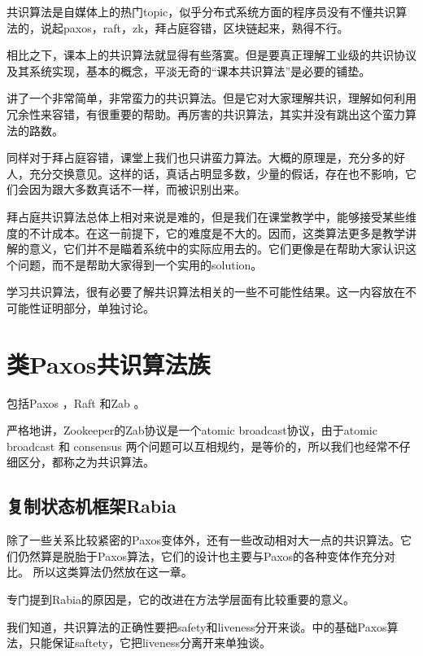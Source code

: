 \documentclass[UTF8]{ctexrep}
\begin{document}
共识算法是自媒体上的热门topic，似乎分布式系统方面的程序员没有不懂共识算法的，说起paxos，raft，zk，拜占庭容错，区块链起来，熟得不行。

相比之下，课本上的共识算法就显得有些落寞。但是要真正理解工业级的共识协议及其系统实现，基本的概念，平淡无奇的“课本共识算法”是必要的铺垫。

\cite[Sec 5.1.3]{Attiya04}讲了一个非常简单，非常蛮力的共识算法。但是它对大家理解共识，理解如何利用冗余性来容错，有很重要的帮助。再厉害的共识算法，其实并没有跳出这个蛮力算法的路数。

同样对于拜占庭容错，课堂上我们也只讲蛮力算法\cite[Sec 5.2.4, Sec 5.2.5]{Attiya04}。大概的原理是，充分多的好人，充分交换意见。这样的话，真话占明显多数，少量的假话，存在也不影响，它们会因为跟大多数真话不一样，而被识别出来。

拜占庭共识算法总体上相对来说是难的，但是我们在课堂教学中，能够接受某些维度的不计成本。在这一前提下，它的难度是不大的。因而，这类算法更多是教学讲解的意义，它们并不是瞄着系统中的实际应用去的。它们更像是在帮助大家认识这个问题，而不是帮助大家得到一个实用的solution。

学习共识算法，很有必要了解共识算法相关的一些不可能性结果。这一内容放在不可能性证明部分，单独讨论。


\chapter{类Paxos共识算法族}


包括Paxos \cite{Lamport01}，Raft \cite{Ongaro14}和Zab \cite{Hunt10, Junqueira11}。

严格地讲，Zookeeper的Zab协议是一个atomic broadcast协议，由于atomic broadcast 和 consensus 两个问题可以互相规约，是等价的\cite{Chandra96unreliable}，所以我们也经常不仔细区分，都称之为共识算法。

\section{复制状态机框架Rabia} \label{Sec_Rabia}

除了一些关系比较紧密的Paxos变体外，还有一些改动相对大一点的共识算法。它们仍然算是脱胎于Paxos算法，它们的设计也主要与Paxos的各种变体作充分对比。
所以这类算法仍然放在这一章。

专门提到Rabia的原因是，它的改进在方法学层面有比较重要的意义。

我们知道，共识算法的正确性要把safety和liveness分开来谈。\cite{Lamport01}中的基础Paxos算法，只能保证saftety，它把liveness分离开来单独谈。
\end{document}
